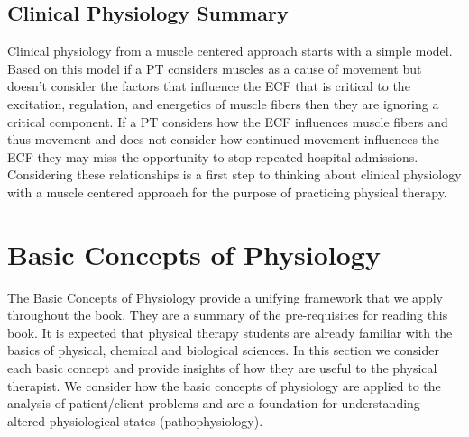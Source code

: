 \subsection{Clinical Physiology Summary}

Clinical physiology from a muscle centered approach starts with a simple model. Based on this model if a PT considers muscles as a cause of movement but doesn't consider the factors that influence the ECF that is critical to the excitation, regulation, and energetics\footnotemark{} of muscle fibers then they are ignoring a critical component. If a PT considers how the ECF influences muscle fibers and thus movement and does not consider how continued movement influences the ECF they may miss the opportunity to stop repeated hospital admissions.\footnotemark{} Considering these relationships is a first step to thinking about clinical physiology with a muscle centered approach for the purpose of practicing physical therapy.

\section{Basic Concepts of  Physiology}

The Basic Concepts of Physiology provide a unifying framework that we apply throughout the book. They are a summary of the pre-requisites for reading this book. It is expected that physical therapy students are already familiar with the basics of physical, chemical and biological sciences. In this section we consider each basic concept and provide insights of how they are useful to the physical therapist. We consider how the basic concepts of physiology are applied to the analysis of patient/client problems and are a foundation for understanding altered physiological states (pathophysiology).
